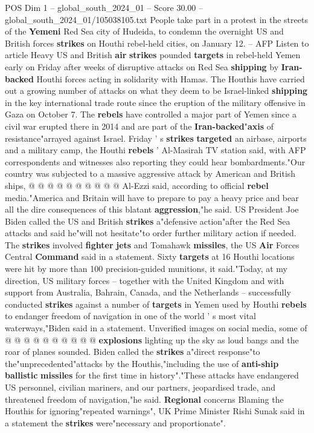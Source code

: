 \begin{textsample}{POS Dim 1 – global\_south\_2024\_01 – Score 30.00 – global\_south\_2024\_01/105038105.txt}  \label{ex:f1_pos_101}
People take part in a protest in the streets of the \textbf{Yemeni} Red Sea city of Hudeida, to condemn the overnight US and British forces \textbf{strikes} on Houthi rebel-held cities, on January 12. -- AFP Listen to article Heavy US and British \textbf{air} \textbf{strikes} pounded \textbf{targets} in rebel-held Yemen early on Friday after weeks of disruptive attacks on Red Sea \textbf{shipping} by \textbf{Iran-backed} Houthi forces acting in solidarity with Hamas.
The Houthis have carried out a growing number of attacks on what they deem to be Israel-linked \textbf{shipping} in the key international trade route since the eruption of the military offensive in Gaza on October 7.
The \textbf{rebels} have controlled a major part of Yemen since a civil war erupted there in 2014 and are part of the \textbf{Iran-backed}"\textbf{axis} of resistance"arrayed against Israel.
Friday ' s \textbf{strikes} \textbf{targeted} an airbase, airports and a military camp, the Houthi \textbf{rebels} ' Al-Masirah TV station said, with AFP correspondents and witnesses also reporting they could hear bombardments."Our country was subjected to a massive aggressive attack by American and British ships, @ @ @ @ @ @ @ @ @ @ Al-Ezzi said, according to official \textbf{rebel} media."America and Britain will have to prepare to pay a heavy price and bear all the dire consequences of this blatant \textbf{aggression},"he said.
US President Joe Biden called the US and British \textbf{strikes} a"defensive action"after the Red Sea attacks and said he"will not hesitate"to order further military action if needed.
The \textbf{strikes} involved \textbf{fighter} \textbf{jets} and Tomahawk \textbf{missiles}, the US \textbf{Air} Forces Central \textbf{Command} said in a statement.
Sixty \textbf{targets} at 16 Houthi locations were hit by more than 100 precision-guided munitions, it said."Today, at my direction, US military forces -- together with the United Kingdom and with support from Australia, Bahrain, Canada, and the Netherlands -- successfully conducted \textbf{strikes} against a number of \textbf{targets} in Yemen used by Houthi \textbf{rebels} to endanger freedom of navigation in one of the world ' s most vital waterways,"Biden said in a statement.
Unverified images on social media, some of @ @ @ @ @ @ @ @ @ @ \textbf{explosions} lighting up the sky as loud bangs and the roar of planes sounded.
Biden called the \textbf{strikes} a"direct response"to the"unprecedented"attacks by the Houthis,"including the use of \textbf{anti-ship} \textbf{ballistic} \textbf{missiles} for the first time in history"."These attacks have endangered US personnel, civilian mariners, and our partners, jeopardised trade, and threatened freedom of navigation,"he said. \textbf{Regional} concerns Blaming the Houthis for ignoring"repeated warnings", UK Prime Minister Rishi Sunak said in a statement the \textbf{strikes} were"necessary and proportionate".

\end{textsample}
